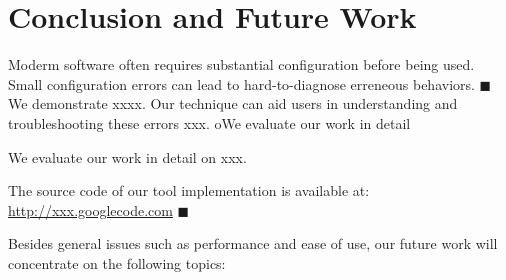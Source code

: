 \section{Conclusion and Future Work}



Moderm software often requires substantial configuration
before being used. Small configuration errors can lead to
hard-to-diagnose erreneous behaviors.
$\blacksquare$ We demonstrate xxxx.
Our technique can aid users in understanding and
troubleshooting these errors xxx.
oWe evaluate our work in detail

We evaluate our work in detail on xxx.

The source code of our tool implementation is available at:
\url{http://xxx.googlecode.com} $\blacksquare$

\vspace{1mm}

Besides general issues such as performance and ease of use, our future
work will concentrate on the following topics:


